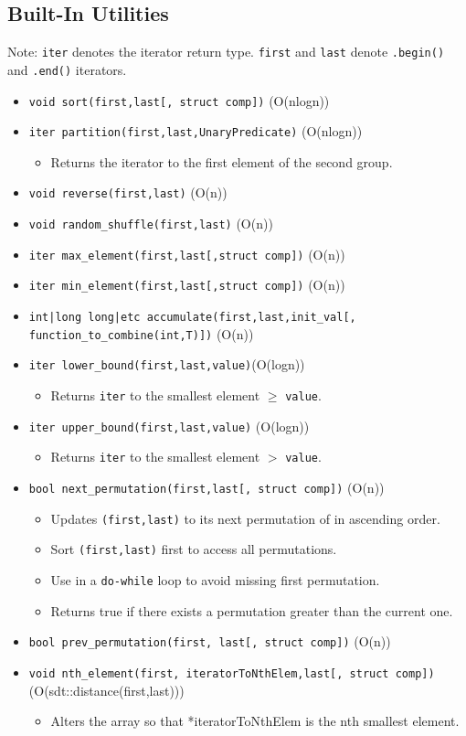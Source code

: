 \documentclass{report}
\newcommand{\citem}[1]{\item \texttt{#1}}
\begin{document}
\subsection{Built-In Utilities}
Note: \texttt{iter} denotes the iterator return type. \texttt{first} and \texttt{last} denote \texttt{.begin()} and \texttt{.end()} iterators.
\begin{itemize}
    \citem{void sort(first,last[, struct comp])} (O(nlogn))
    \citem{iter partition(first,last,UnaryPredicate)} (O(nlogn))
    \begin{itemize}
    \item Returns the iterator to the first element of the second group.
    \end{itemize}
    \citem{void reverse(first,last)} (O(n))
    \citem{void random\_shuffle(first,last)} (O(n))
    \citem{iter max\_element(first,last[,struct comp])} (O(n))
    \citem{iter min\_element(first,last[,struct comp])} (O(n))
    \citem{int|long long|etc accumulate(first,last,init\_val[, function\_to\_combine(int,T)])} (O(n))
    \citem{iter lower\_bound(first,last,value)}(O(logn))
    \begin{itemize}
        \item Returns \texttt{iter} to the smallest element $\geq$ \texttt{value}.
    \end{itemize}
    \citem{iter upper\_bound(first,last,value)} (O(logn))
    \begin{itemize}
        \item Returns \texttt{iter} to the smallest element $>$ \texttt{value}.
    \end{itemize}
    \citem{bool next\_permutation(first,last[, struct comp])} (O(n))
    \begin{itemize}
        \item Updates \texttt{(first,last)} to its next permutation of in ascending order.
        \item Sort \texttt{(first,last)} first to access all permutations.
        \item Use in a \texttt{do-while} loop to avoid missing first permutation.
        \item Returns true if there exists a permutation greater than the current one.
    \end{itemize}
    \citem{bool prev\_permutation(first, last[, struct comp])} (O(n))
    \citem{void nth\_element(first, iteratorToNthElem,last[, struct comp])} (O(sdt::distance(first,last)))
    \begin{itemize}
        \item Alters the array so that *iteratorToNthElem is the nth smallest element.

\end{itemize}
\end{itemize}
\end{document}
